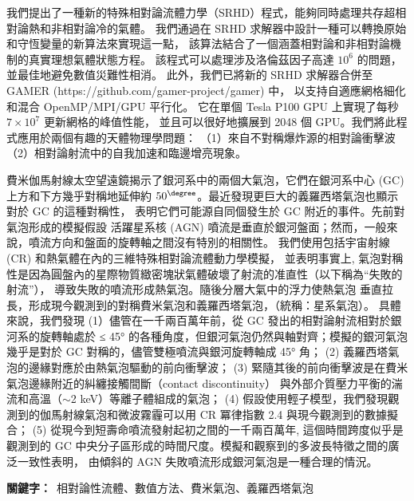 \begin{abstractzh}
{我們提出了一種新的特殊相對論流體力學（SRHD）程式，能夠同時處理共存超相對論熱和非相對論冷的氣體。
我們通過在 SRHD 求解器中設計一種可以轉換原始和守恆變量的新算法來實現這一點，
該算法結合了一個涵蓋相對論和非相對論機制的真實理想氣體狀態方程。
該程式可以處理涉及洛倫茲因子高達 $10^6$ 的問題，並最佳地避免數值災難性相消。
此外，我們已將新的 SRHD 求解器合併至 GAMER (https://github.com/gamer-project/gamer) 中，
以支持自適應網格細化和混合 OpenMP/MPI/GPU 平行化。
它在單個 Tesla P100 GPU 上實現了每秒 $7\times10^7$ 更新網格的峰值性能，
並且可以很好地擴展到 2048 個 GPU。我們將此程式應用於兩個有趣的天體物理學問題：
（1）來自不對稱爆炸源的相對論衝擊波（2）相對論射流中的自我加速和臨邊增亮現象。

費米伽馬射線太空望遠鏡揭示了銀河系中的兩個大氣泡，它們在銀河系中心 (GC)
上方和下方幾乎對稱地延伸約 $50^\degree$。最近發現更巨大的義羅西塔氣泡也顯示對於 GC 的這種對稱性，
表明它們可能源自同個發生於 GC 附近的事件。先前對氣泡形成的模擬假設
活躍星系核 (AGN) 噴流是垂直於銀河盤面；然而，一般來說，噴流方向和盤面的旋轉軸之間沒有特別的相關性。
我們使用包括宇宙射線 (CR) 和熱氣體在內的三維特殊相對論流體動力學模擬，
並表明事實上, 氣泡對稱性是因為圓盤內的星際物質緻密塊狀氣體破壞了射流的准直性（以下稱為“失敗的射流”），
導致失敗的噴流形成熱氣泡。隨後分層大氣中的浮力使熱氣泡
垂直拉長，形成現今觀測到的對稱費米氣泡和義羅西塔氣泡，（統稱：星系氣泡）。
具體來說，我們發現
(1）儘管在一千兩百萬年前，從 GC 發出的相對論射流相對於銀河系的旋轉軸處於 ≤ 45°
的各種角度，但銀河氣泡仍然與軸對齊；模擬的銀河氣泡幾乎是對於 GC 對稱的，儘管雙極噴流與銀河旋轉軸成 45° 角；
(2) 義羅西塔氣泡的邊緣對應於由熱氣泡驅動的前向衝擊波；
(3) 緊隨其後的前向衝擊波是在費米氣泡邊緣附近的糾纏接觸間斷（contact discontinuity）
與外部介質壓力平衡的湍流和高溫（$\sim$2 keV）等離子體組成的氣泡；
(4) 假設使用輕子模型，我們發現觀測到的伽馬射線氣泡和微波霧霾可以用 CR 冪律指數 2.4 與現今觀測到的數據擬合；
(5) 從現今到短壽命噴流發射起初之間的一千兩百萬年, 這個時間跨度似乎是觀測到的 GC
中央分子區形成的時間尺度。模擬和觀察到的多波長特徵之間的廣泛一致性表明，
由傾斜的 AGN 失敗噴流形成銀河氣泡是一種合理的情況。}
\bigbreak
\noindent \textbf{關鍵字：}{\, \makeatletter 相對論性流體、數值方法、費米氣泡、義羅西塔氣泡 \makeatother}
\end{abstractzh}

